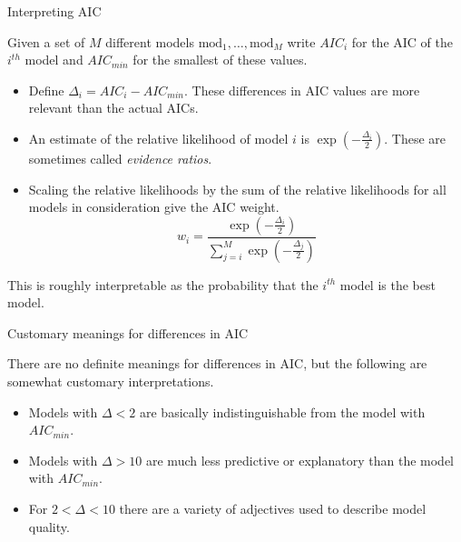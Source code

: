\documentclass[
  ignorenonframetext,
]{beamer}
\providecommand{\tightlist}{%
  \setlength{\itemsep}{0pt}\setlength{\parskip}{0pt}}
\begin{document}
\begin{frame}{Interpreting AIC}
\protect\hypertarget{interpreting-aic}{}

Given a set of \(M\) different models
\(\text{mod}_1,\ldots,\text{mod}_M\) write \(AIC_i\) for the AIC of the
\(i^{th}\) model and \(AIC_{min}\) for the smallest of these values.

\begin{itemize}
\item
  Define \(\Delta_i=AIC_i-AIC_{min}\). These differences in AIC values
  are more relevant than the actual AICs.
\item
  An estimate of the relative likelihood of model \(i\) is
  \(\exp\left(-\frac{\Delta_i}{2}\right)\). These are sometimes called
  \emph{evidence ratios}.
\item
  Scaling the relative likelihoods by the sum of the relative
  likelihoods for all models in consideration give the AIC weight. \[
  w_i=\frac{\exp\left(-\frac{\Delta_i}{2}\right)}{\sum_{j=i}^{M}\exp\left(-\frac{\Delta_j}{2}\right)}
  \]
\end{itemize}

This is roughly interpretable as the probability that the \(i^{th}\)
model is the best model.

\end{frame}

\begin{frame}{Customary meanings for differences in AIC}
\protect\hypertarget{customary-meanings-for-differences-in-aic}{}

There are no definite meanings for differences in AIC, but the following
are somewhat customary interpretations.

\begin{itemize}
\tightlist
\item
  Models with \(\Delta<2\) are basically indistinguishable from the
  model with \(AIC_{min}\).
\item
  Models with \(\Delta>10\) are much less predictive or explanatory than
  the model with \(AIC_{min}\).
\item
  For \(2<\Delta<10\) there are a variety of adjectives used to describe
  model quality.
\end{itemize}

\end{frame}
\end{document}
